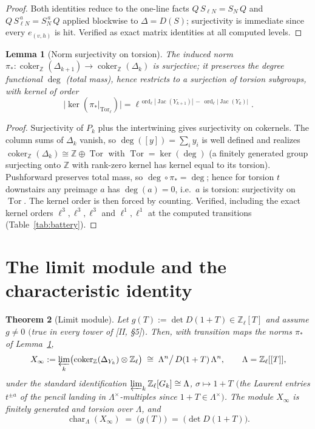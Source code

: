 \documentclass[11pt]{amsart}
\numberwithin{equation}{section}
\newtheorem{theorem}{Theorem}[section]
\newtheorem{lemma}[theorem]{Lemma}
\theoremstyle{definition}
\theoremstyle{remark}
\newcommand{\Z}{\mathbb{Z}}
\newcommand{\Zl}{\Z_\ell}
\newcommand{\La}{\Lambda}
\newcommand{\Jac}{\operatorname{Jac}}
\newcommand{\coker}{\operatorname{coker}}
\newcommand{\Tor}{\operatorname{Tor}}
\newcommand{\ord}{\operatorname{ord}}
\newcommand{\car}{\operatorname{char}_{\La}}
\begin{document}
\begin{proof}
Both identities reduce to the one-line facts $Q\,S_{\ell N}=S_N\,Q$ and
$Q\,S_{\ell N}^{\,a}=S_N^{\,a}\,Q$ applied blockwise to $\Delta=D(S)$; surjectivity
is immediate since every $e_{(v,h)}$ is hit. Verified as exact matrix identities at
all computed levels.
\end{proof}

\begin{lemma}[Norm surjectivity on torsion]\label{lem:torsurj}
The induced norm
$\pi_*\colon\coker_\Z(\Delta_{k+1})\to\coker_\Z(\Delta_k)$ is
surjective; it preserves the degree functional $\deg$ (total mass), hence restricts
to a surjection of torsion subgroups, with kernel of order
\[
\bigl|\ker(\pi_*|_{\Tor_\ell})\bigr|
=\ell^{\,\ord_\ell|\Jac(Y_{k+1})|\,-\,\ord_\ell|\Jac(Y_k)|}.
\]
\end{lemma}

\begin{proof}
Surjectivity of $P_k$ plus the intertwining gives surjectivity on cokernels. The
column sums of $\Delta_k$ vanish, so $\deg([y])=\sum_iy_i$ is well defined and
realizes $\coker_\Z(\Delta_k)\cong\Z\oplus\Tor$ with $\Tor=\ker(\deg)$ (a finitely
generated group surjecting onto $\Z$ with rank-zero kernel has kernel equal to its
torsion). Pushforward preserves total mass, so $\deg\circ\pi_*=\deg$; hence for
torsion $t$ downstairs any preimage $a$ has $\deg(a)=0$, i.e.\ $a$ is torsion:
surjectivity on $\Tor$. The kernel order is then forced by counting. Verified,
including the exact kernel orders $\ell^{3},\ell^{3},\ell^{3}$ and
$\ell^{1},\ell^{1}$ at the computed transitions (Table~\ref{tab:battery}).
\end{proof}

\section{The limit module and the characteristic identity}\label{sec:limit}

\begin{theorem}[Limit module]\label{thm:limit}
Let $g(T):=\det D(1+T)\in\Zl[T]$ and assume $g\neq0$ $($true in every tower of
{\rm[II, \S5]}$)$. Then, with transition maps the norms $\pi_*$ of
Lemma~\ref{lem:torsurj},
\[
X_\infty:=\varprojlim_k\bigl(\coker_\Z(\Delta_{Y_k})\otimes\Zl\bigr)
\;\cong\;\La^n\big/\,D(1+T)\,\La^n ,
\qquad \La=\Zl[[T]],
\]
under the standard identification $\varprojlim_k\Zl[G_k]\cong\La$,
$\sigma\mapsto1+T$ $($the Laurent entries $t^{\pm a}$ of the pencil landing in
$\La^\times$-multiples since $1+T\in\La^\times)$. The module $X_\infty$ is finitely
generated and torsion over $\La$, and
\[
\car(X_\infty)\;=\;\bigl(g(T)\bigr)\;=\;\bigl(\det D(1+T)\bigr).
\]
\end{theorem}
\end{document}
